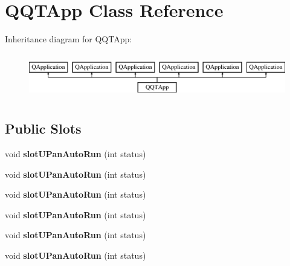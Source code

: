 \hypertarget{class_q_q_t_app}{}\section{Q\+Q\+T\+App Class Reference}
\label{class_q_q_t_app}
Inheritance diagram for Q\+Q\+T\+App\+:\begin{figure}[H]
\begin{center}
\leavevmode
\includegraphics[height=2.000000cm]{class_q_q_t_app}
\end{center}
\end{figure}
\subsection*{Public Slots}
\begin{DoxyCompactItemize}
\item 
\mbox{\label{class_q_q_t_app_a139aa813870d2b9ab17145a2167fdb02}} 
void {\bfseries slot\+U\+Pan\+Auto\+Run} (int status)
\item 
\mbox{\label{class_q_q_t_app_a139aa813870d2b9ab17145a2167fdb02}} 
void {\bfseries slot\+U\+Pan\+Auto\+Run} (int status)
\item 
\mbox{\label{class_q_q_t_app_a139aa813870d2b9ab17145a2167fdb02}} 
void {\bfseries slot\+U\+Pan\+Auto\+Run} (int status)
\item 
\mbox{\label{class_q_q_t_app_a139aa813870d2b9ab17145a2167fdb02}} 
void {\bfseries slot\+U\+Pan\+Auto\+Run} (int status)
\item 
\mbox{\label{class_q_q_t_app_a139aa813870d2b9ab17145a2167fdb02}} 
void {\bfseries slot\+U\+Pan\+Auto\+Run} (int status)
\item 
\mbox{\label{class_q_q_t_app_a139aa813870d2b9ab17145a2167fdb02}} 
void {\bfseries slot\+U\+Pan\+Auto\+Run} (int status)
\end{DoxyCompactItemize}

